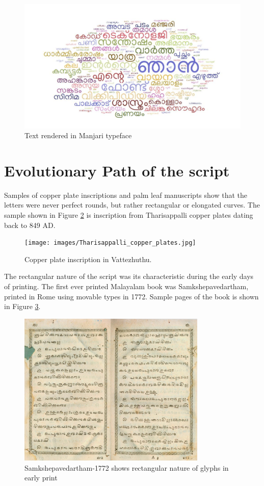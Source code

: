 \documentclass[10pt]{article}
\begin{document}
\begin{figure}[h!]
	\centering
	\includegraphics[width=\textwidth]{images/wordcloud.jpg}
	\caption{Text rendered in Manjari typeface}
	\label{wordcloud}
\end{figure} 

\section{Evolutionary Path of the script}

Samples of copper plate inscriptions and palm leaf manuscripts show that the letters were never perfect rounds, but rather rectangular or elongated curves. The sample shown in Figure \ref{vattezhuthu} is inscription from Tharisappalli copper plates dating back to 849 AD.


\begin{figure}[h!]
	\centering
	\texttt{[image: images/Tharisappalli\_copper\_plates.jpg]}
	\caption{Copper plate inscription in Vattezhuthu.}
	\label{vattezhuthu}
\end{figure} 


The rectangular nature of the script was its characteristic during the early days of printing. The first ever printed Malayalam book was Samkshepavedartham, printed in Rome using movable types in 1772. Sample pages of the book is shown in Figure \ref{Samkshepam}. 


\begin{figure}[h!]
	\centering
	\includegraphics[width=0.8\textwidth]{images/samkshepavedartham1772.png}
	\caption{Samkshepavedartham-1772 shows rectangular nature of glyphs in early print}
	\label{Samkshepam}
\end{figure} 
\end{document}
